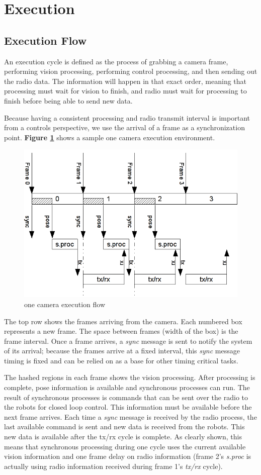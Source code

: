 \documentclass[letterpaper]{llncs}
\begin{document}
\section{Execution}

\subsection{Execution Flow}
An execution cycle is defined as the process of grabbing a camera frame, performing vision processing, performing control processing, and then sending out the radio data. The information will happen in that exact order, meaning that processing must wait for vision to finish, and radio must wait for processing to finish before being able to send new data.

Because having a consistent processing and radio transmit interval is important from a controls perspective, we use the arrival of a frame as a synchronization point. \textbf{Figure \ref{execflow}} shows a sample one camera execution environment.

\begin{figure}[h]
	\centering
	\includegraphics[width=.75\textwidth]{images/execflow.png}
	\caption{one camera execution flow}
	\label{execflow}
\end{figure}

The top row shows the frames arriving from the camera. Each numbered box represents a new frame. The space between frames (width of the box) is the frame interval. Once a frame arrives, a \textit{sync} message is sent to notify the system of its arrival; because the frames arrive at a fixed interval, this \textit{sync} message timing is fixed and can be relied on as a base for other timing critical tasks.

The hashed regions in each frame shows the vision processing. After processing is complete, pose information is available and synchronous processes can run. The result of synchronous processes is commands that can be sent over the radio to the robots for closed loop control. This information must be available before the next frame arrives. Each time a \textit{sync} message is received by the radio process, the last available command is sent and new data is received from the robots. This new data is available after the tx/rx cycle is complete. As clearly shown, this means that synchronous processing during one cycle uses the current available vision information and one frame delay on radio information (frame 2's \textit{s.proc} is actually using radio information received during frame 1's \textit{tx/rx} cycle).
\end{document}
